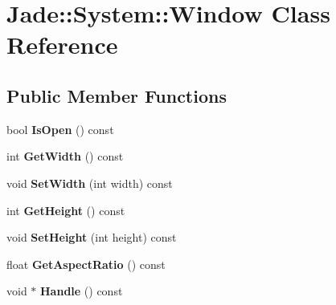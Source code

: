 \hypertarget{class_jade_1_1_system_1_1_window}{}\section{Jade\+:\+:System\+:\+:Window Class Reference}
\label{class_jade_1_1_system_1_1_window}
\subsection*{Public Member Functions}
\begin{DoxyCompactItemize}
\item 
\hypertarget{class_jade_1_1_system_1_1_window_a3d6db589237ba8c173e876b4da44261f}{}bool {\bfseries Is\+Open} () const \label{class_jade_1_1_system_1_1_window_a3d6db589237ba8c173e876b4da44261f}

\item 
\hypertarget{class_jade_1_1_system_1_1_window_a28c7ebb91e752ec16f1550393f8d96b5}{}int {\bfseries Get\+Width} () const \label{class_jade_1_1_system_1_1_window_a28c7ebb91e752ec16f1550393f8d96b5}

\item 
\hypertarget{class_jade_1_1_system_1_1_window_adfc7b77a2b4f48d08da1e1e41543b44a}{}void {\bfseries Set\+Width} (int width) const \label{class_jade_1_1_system_1_1_window_adfc7b77a2b4f48d08da1e1e41543b44a}

\item 
\hypertarget{class_jade_1_1_system_1_1_window_a73e056060c2af44d3f8fd0f950fe3192}{}int {\bfseries Get\+Height} () const \label{class_jade_1_1_system_1_1_window_a73e056060c2af44d3f8fd0f950fe3192}

\item 
\hypertarget{class_jade_1_1_system_1_1_window_a15efc837b2906cbd8b521bbe355fd80c}{}void {\bfseries Set\+Height} (int height) const \label{class_jade_1_1_system_1_1_window_a15efc837b2906cbd8b521bbe355fd80c}

\item 
\hypertarget{class_jade_1_1_system_1_1_window_a3b9474c8b49b42b3d5657dc2c21fd59c}{}float {\bfseries Get\+Aspect\+Ratio} () const \label{class_jade_1_1_system_1_1_window_a3b9474c8b49b42b3d5657dc2c21fd59c}

\item 
\hypertarget{class_jade_1_1_system_1_1_window_a1489a0e9995db4c89b5be8a8ab02971b}{}void $\ast$ {\bfseries Handle} () const \label{class_jade_1_1_system_1_1_window_a1489a0e9995db4c89b5be8a8ab02971b}


\end{DoxyCompactItemize}
